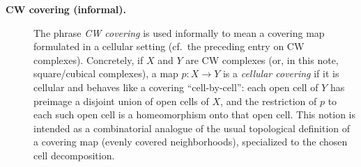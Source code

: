 \documentclass[11pt,a4paper]{article}
\theoremstyle{definition}
\theoremstyle{remark}
\begin{document}
\begin{description}
  \item[\textbf{CW covering (informal).}]
  The phrase \emph{CW covering} is used informally to mean a covering map formulated in a cellular setting (cf.\ the preceding entry on CW complexes).
  Concretely, if \(X\) and \(Y\) are CW complexes (or, in this note, square/cubical complexes), a map \(p:X\to Y\) is a \emph{cellular covering} if it is cellular and behaves like a covering ``cell-by-cell'': each open cell of \(Y\) has preimage a disjoint union of open cells of \(X\), and the restriction of \(p\) to each such open cell is a homeomorphism onto that open cell.
  This notion is intended as a combinatorial analogue of the usual topological definition of a covering map (evenly covered neighborhoods), specialized to the chosen cell decomposition.
\end{description}



\end{document}
